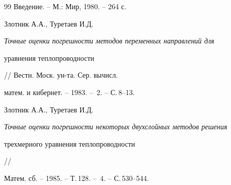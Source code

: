 \begin{thebibliography}{99}
{Введение.} -- М.: Мир, 1980. -- 264 с.




Злотник А.А., Туретаев И.Д.


{\it Точные оценки погрешности методов переменных направлений для


уравнения теплопроводности} // Вестн. Моск. ун-та. Сер. вычисл.


матем. и кибернет. -- 1983. -- \No\,2. -- С.\,8--13.




Злотник А.А., Туретаев И.Д.


{\it Точные оценки погрешности некоторых двухслойных методов решения


трехмерного уравнения теплопроводности} //


Матем. сб. -- 1985. -- Т.\,128. -- \No\,4. -- С.\,530--544.





\end{thebibliography}





\vskip 2cm












\label{end}








